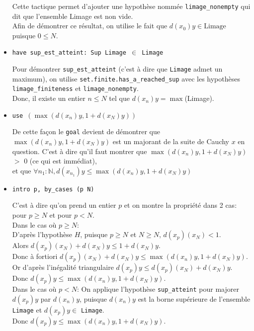 \begin{itemize}
    
    Cette tactique permet d'ajouter une hypothèse nommée \texttt{limage\_nonempty} qui dit que l'ensemble Limage est non vide.\\ Afin de démontrer ce résultat, on utilise le fait que $d (x_0) y  \in \textrm{Limage}$ puisque $0 \leq N$.
    \item \texttt{have sup\_est\_atteint: Sup Limage $\in$ Limage}
    
    
    Pour démontrer \texttt{sup\_est\_atteint} (c'est à dire que \texttt{Limage} admet un maximum), on utilise \texttt{set.finite.has\_a\_reached\_sup} avec les hypothèses \texttt{limage\_finiteness} et \texttt{limage\_nonempty}.\\ Donc, il existe un entier $n\leq N$ tel que $d (x_n) y= \max$(\textrm{Limage}).
    \item \texttt{use $(\max (d(x_n)y , 1+d(x_N)y))$}
    
    
    De cette façon le \texttt{goal} devient de démontrer que $\max(d(x_n)y , 1+d(x_N)y)$ est un majorant de la suite de Cauchy $x$ en question. \newline C'est à dire qu'il faut montrer que $\max(d(x_n)y , 1+d(x_N)y)$ $>$ $0$ (ce qui est immédiat), \\ et que $\forall n_1 : \mathbb{N}, d (x_{n_1}) y \leq \max (d(x_n)y , 1+ d(x_N) y)$
    \item \texttt{intro p, by\_cases (p \geq N)}
    
    
    C'est à dire qu'on prend un entier $p$ et on montre la propriété dans 2 cas: pour $p \geq N$ et pour $p < N$. \\
    Dans le cas où $p \geq N$: \\ D'après l'hypothèse $H$, puisque $p \geq N$ et $N \geq N$, $d (x_p) (x_N) < 1$. \\ Alors $d (x_p) (x_N) + d (x_N) y \leq 1 + d (x_N) y$. \\ Donc à fortiori $d (x_p) (x_N) + d (x_N) y \leq \max (d (x_n) y , 1 + d (x_N) y)$. 
    \\ Or d'après l'inégalité triangulaire $d (x_p) y \leq d (x_p) (x_N) + d (x_N) y$. \\ Donc $d (x_p) y \leq \max (d (x_n) y , 1 + d (x_N) y)$.\\
    Dans le cas où $p < N$: \newline On applique l'hypothèse \texttt{sup\_atteint} pour majorer $d (x_p) y$ par $d (x_n) y$, puisque $d (x_n) y$ est la borne supérieure de l'ensemble \texttt{Limage} et $d (x_p) y \in$ \texttt{Limage}.\\
    Donc $d (x_p) y \leq \max (d (x_n) y , 1 + d (x_N) y)$.
\end{itemize}
